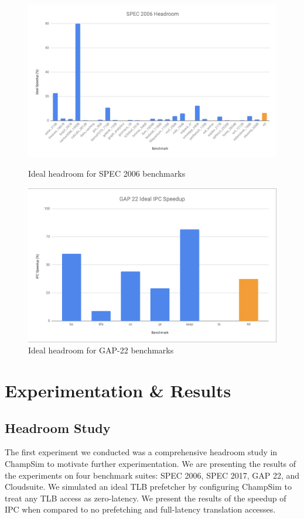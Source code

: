 \documentclass[conference]{IEEEtran}
\begin{document}
    \begin{figure}[p]
        \centering
            \includegraphics[width=.95\textwidth]{spec_ideal}
        \caption{Ideal headroom for SPEC 2006 benchmarks}
        \vspace*{\floatsep}
        \vspace*{\floatsep}
            \includegraphics[width=.75\textwidth]{gap22_ideal}
        \caption{Ideal headroom for GAP-22 benchmarks}
    \end{figure}
\section{Experimentation \& Results}

    \subsection{Headroom Study}
        The first experiment we conducted was a comprehensive headroom study in ChampSim to motivate further experimentation. We are presenting the results of the experiments on four benchmark suites: SPEC 2006, SPEC 2017, GAP 22, and Cloudsuite. We simulated an ideal TLB prefetcher by configuring ChampSim to treat any TLB access as zero-latency. We present the results of the speedup of IPC when compared to no prefetching and full-latency translation accesses. 
\end{document}
